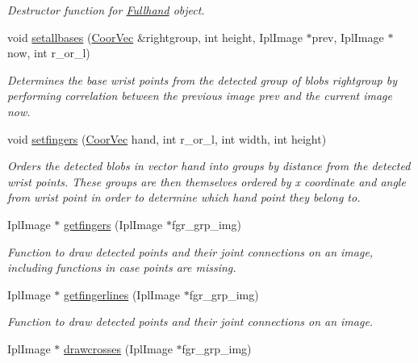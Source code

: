 \begin{DoxyCompactItemize}
\begin{DoxyCompactList}\small\item\em Destructor function for \hyperlink{classFullhand}{Fullhand} object. \end{DoxyCompactList}\item 
void \hyperlink{classFullhand_a30f72eeb4ec77f7fa34b9cee5d7df255}{setallbases} (\hyperlink{blobby_8h_a7017012a1393f7249d0e03d6ac9f1c7b}{CoorVec} \&rightgroup, int height, IplImage $\ast$prev, IplImage $\ast$now, int r\_\-or\_\-l)
\begin{DoxyCompactList}\small\item\em Determines the base wrist points from the detected group of blobs {\itshape rightgroup\/} by performing correlation between the previous image {\itshape prev\/} and the current image {\itshape now\/}. \end{DoxyCompactList}\item 
void \hyperlink{classFullhand_ad645abf60b7a1c1f85d3dd04a49d48a9}{setfingers} (\hyperlink{blobby_8h_a7017012a1393f7249d0e03d6ac9f1c7b}{CoorVec} hand, int r\_\-or\_\-l, int width, int height)
\begin{DoxyCompactList}\small\item\em Orders the detected blobs in vector {\itshape hand\/} into groups by distance from the detected wrist points. These groups are then themselves ordered by x coordinate and angle from wrist point in order to determine which hand point they belong to. \end{DoxyCompactList}\item 
IplImage $\ast$ \hyperlink{classFullhand_a296cf91ff96442ddf05397baa621acfe}{getfingers} (IplImage $\ast$fgr\_\-grp\_\-img)
\begin{DoxyCompactList}\small\item\em Function to draw detected points and their joint connections on an image, including functions in case points are missing. \end{DoxyCompactList}\item 
IplImage $\ast$ \hyperlink{classFullhand_aa3dd5a64c976321b5e3817684898ae97}{getfingerlines} (IplImage $\ast$fgr\_\-grp\_\-img)
\begin{DoxyCompactList}\small\item\em Function to draw detected points and their joint connections on an image. \end{DoxyCompactList}\item 
IplImage $\ast$ \hyperlink{classFullhand_ad6f1c876e703d0a6e30d7a5d202e36b5}{drawcrosses} (IplImage $\ast$fgr\_\-grp\_\-img)

\end{DoxyCompactItemize}
